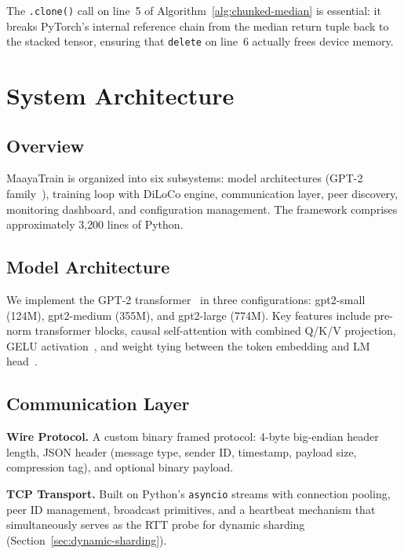 \documentclass[10pt,conference]{IEEEtran}
\begin{document}
The \texttt{.clone()} call on line~5 of Algorithm~\ref{alg:chunked-median} is
essential: it breaks PyTorch's internal reference chain from the median return
tuple back to the stacked tensor, ensuring that \texttt{delete} on line~6
actually frees device memory.


\section{System Architecture}
\label{sec:architecture}

\subsection{Overview}

MaayaTrain is organized into six subsystems: model architectures (GPT-2
family~\cite{radford2019gpt2}), training loop with DiLoCo engine,
communication layer, peer discovery, monitoring dashboard, and configuration
management. The framework comprises approximately 3{,}200 lines of Python.

\subsection{Model Architecture}

We implement the GPT-2 transformer~\cite{radford2019gpt2} in three
configurations: gpt2-small (124M), gpt2-medium (355M), and gpt2-large (774M).
Key features include pre-norm transformer blocks, causal self-attention with
combined Q/K/V projection, GELU activation~\cite{hendrycks2016gelu}, and
weight tying between the token embedding and LM head~\cite{press2017tying}.

\subsection{Communication Layer}

\textbf{Wire Protocol.} A custom binary framed protocol: 4-byte big-endian
header length, JSON header (message type, sender ID, timestamp, payload size,
compression tag), and optional binary payload.

\textbf{TCP Transport.} Built on Python's \texttt{asyncio} streams with
connection pooling, peer ID management, broadcast primitives, and a heartbeat
mechanism that simultaneously serves as the RTT probe for dynamic sharding
(Section~\ref{sec:dynamic-sharding}).
\end{document}
